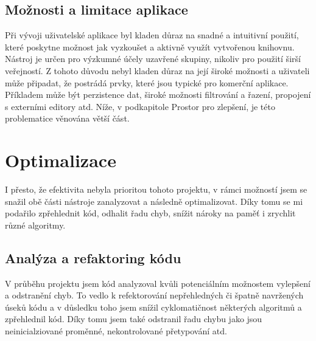 	   \subsection{Možnosti a limitace aplikace}
	   		Při vývoji uživatelské aplikace byl kladen důraz na snadné a intuitivní použití, které poskytne možnost jak vyzkoušet a aktivně využít vytvořenou knihovnu. Nástroj je určen pro výzkumné účely uzavřené skupiny, nikoliv pro použití širší veřejností. Z tohoto důvodu nebyl kladen důraz na její široké možnosti a uživateli může připadat, že postrádá prvky, které jsou typické pro komerční aplikace. Příkladem může být perzistence dat, široké možnosti filtrování a řazení, propojení s externími editory atd. Níže, v podkapitole Prostor pro zlepšení, je této problematice věnována větší část.




\section{Optimalizace}
	I přesto, že efektivita nebyla prioritou tohoto projektu, v rámci možností jsem se snažil obě části nástroje zanalyzovat a následně optimalizovat. Díky tomu se mi podařilo zpřehlednit kód, odhalit řadu chyb, snížit nároky na paměť i zrychlit různé algoritmy.

	\subsection{Analýza a refaktoring kódu}
		V průběhu projektu jsem kód analyzoval kvůli potenciálním možnostem vylepšení a odstranění chyb. To vedlo k refektorování nepřehledných či špatně navržených úseků kódu a v důsledku toho jsem snížil cyklomatičnost některých algoritmů a zpřehlednil kód. Díky tomu jsem také odstranil řadu chybu jako jsou neinicialziované proměnné, nekontrolované přetypování atd.\\
		
